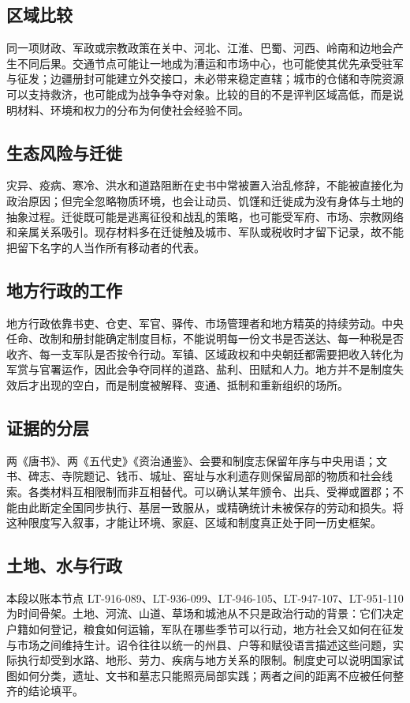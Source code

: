 \subsection{区域比较}
同一项财政、军政或宗教政策在关中、河北、江淮、巴蜀、河西、岭南和边地会产生不同后果。交通节点可能让一地成为漕运和市场中心，也可能使其优先承受驻军与征发；边疆册封可能建立外交接口，未必带来稳定直辖；城市的仓储和寺院资源可以支持救济，也可能成为战争争夺对象。比较的目的不是评判区域高低，而是说明材料、环境和权力的分布为何使社会经验不同。

\subsection{生态风险与迁徙}
灾异、疫病、寒冷、洪水和道路阻断在史书中常被置入治乱修辞，不能被直接化为政治原因；但完全忽略物质环境，也会让动员、饥馑和迁徙成为没有身体与土地的抽象过程。迁徙既可能是逃离征役和战乱的策略，也可能受军府、市场、宗教网络和亲属关系吸引。现存材料多在迁徙触及城市、军队或税收时才留下记录，故不能把留下名字的人当作所有移动者的代表。

\subsection{地方行政的工作}
地方行政依靠书吏、仓吏、军官、驿传、市场管理者和地方精英的持续劳动。中央任命、改制和册封能确定制度目标，不能说明每一份文书是否送达、每一种税是否收齐、每一支军队是否按令行动。军镇、区域政权和中央朝廷都需要把收入转化为军赏与官署运作，因此会争夺同样的道路、盐利、田赋和人力。地方并不是制度失效后才出现的空白，而是制度被解释、变通、抵制和重新组织的场所。

\subsection{证据的分层}
两《唐书》、两《五代史》《资治通鉴》、会要和制度志保留年序与中央用语；文书、碑志、寺院题记、钱币、城址、窑址与水利遗存则保留局部的物质和社会线索。各类材料互相限制而非互相替代。可以确认某年颁令、出兵、受禅或置郡；不能由此断定全国同步执行、基层一致服从，或精确统计未被保存的劳动和损失。将这种限度写入叙事，才能让环境、家庭、区域和制度真正处于同一历史框架。
\subsection{土地、水与行政}
本段以账本节点 LT-916-089、LT-936-099、LT-946-105、LT-947-107、LT-951-110 为时间骨架。土地、河流、山道、草场和城池从不只是政治行动的背景：它们决定户籍如何登记，粮食如何运输，军队在哪些季节可以行动，地方社会又如何在征发与市场之间维持生计。诏令往往以统一的州县、户等和赋役语言描述这些问题，实际执行却受到水路、地形、劳力、疾病与地方关系的限制。制度史可以说明国家试图如何分类，遗址、文书和墓志只能照亮局部实践；两者之间的距离不应被任何整齐的结论填平。

